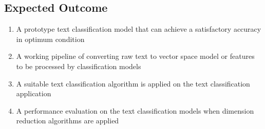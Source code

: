 \subsection{Expected Outcome}
\begin{enumerate}
	\item A prototype text classification model that can achieve a satisfactory accuracy in optimum condition
	\item A working pipeline of converting raw text to vector space model or features to be processed by classification models
	\item A suitable text classification algorithm is applied on the text classification application
	\item A performance evaluation on the text classification models when dimension reduction algorithms are applied
\end{enumerate}

